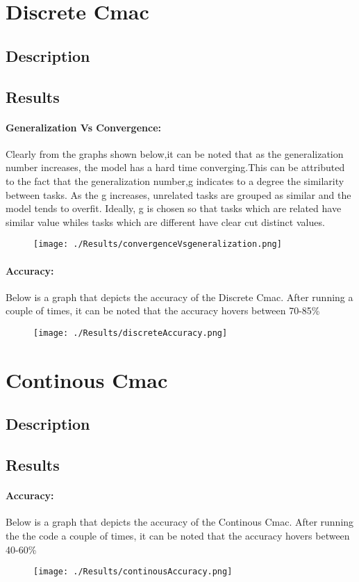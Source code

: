 \documentclass{article}
\begin{document}
\section{Discrete Cmac}
\subsection{Description}
\subsection{Results}
  \paragraph{Generalization Vs Convergence:}
   Clearly from the graphs shown below,it can be noted that  
  as the generalization number increases, the model has a hard time converging.This can
  be attributed to the fact that the generalization number,g indicates to a degree the similarity
  between tasks. As the g increases, unrelated tasks are grouped as similar and the model tends
  to overfit. Ideally, g is chosen so that tasks which are related have similar value whiles tasks
  which are different have clear cut distinct values. 
  \begin{figure}[h!]
    \texttt{[image: ./Results/convergenceVsgeneralization.png]}
  \end{figure}

  \paragraph{Accuracy:}
    Below is a graph that depicts the accuracy of the Discrete Cmac. After running a couple of times, it can 
    be noted that the accuracy hovers between 70-85\%
  \begin{figure}[h!]
    \texttt{[image: ./Results/discreteAccuracy.png]}
  \end{figure}
\newpage 
\section{Continous Cmac}
\subsection{Description}
\subsection{Results}
  \paragraph{Accuracy:}
    Below is a graph that depicts the accuracy of the Continous Cmac. After running the the code a couple of times, it can
    be noted that the accuracy hovers between 40-60\%
  \begin{figure}[h!]
     \texttt{[image: ./Results/continousAccuracy.png]}
  \end{figure}
\end{document}
